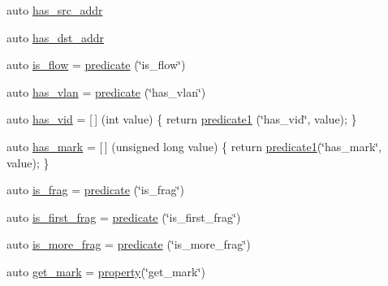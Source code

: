 \begin{DoxyCompactItemize}
\item 
auto \hyperlink{namespacepfq__lang_1_1anonymous__namespace_02default_8hpp_03_aabc75799de679df702f4179ead82114c}{has\+\_\+src\+\_\+addr}
\item 
auto \hyperlink{namespacepfq__lang_1_1anonymous__namespace_02default_8hpp_03_af223a0513ceffa69c0b8535a7cca12da}{has\+\_\+dst\+\_\+addr}
\item 
auto \hyperlink{namespacepfq__lang_1_1anonymous__namespace_02default_8hpp_03_a32aab6804e2daac2458f7c050ed69cf1}{is\+\_\+flow} = \hyperlink{namespacepfq__lang_abd58b2244ff8b0775a3b5865bc128872}{predicate} (\char`\"{}is\+\_\+flow\char`\"{})
\item 
auto \hyperlink{namespacepfq__lang_1_1anonymous__namespace_02default_8hpp_03_a30a0c8d9bcd28cd17c6c1699c3339c3f}{has\+\_\+vlan} = \hyperlink{namespacepfq__lang_abd58b2244ff8b0775a3b5865bc128872}{predicate} (\char`\"{}has\+\_\+vlan\char`\"{})
\item 
auto \hyperlink{namespacepfq__lang_1_1anonymous__namespace_02default_8hpp_03_adddd2dea56164719f2853af158911a80}{has\+\_\+vid} = \mbox{[}$\,$\mbox{]} (int value) \{ return \hyperlink{namespacepfq__lang_ae23a03cee94b5ddfde4a8d2e5c521f0e}{predicate1} (\char`\"{}has\+\_\+vid\char`\"{}, value); \}
\item 
auto \hyperlink{namespacepfq__lang_1_1anonymous__namespace_02default_8hpp_03_a0f9dc3f39bf9793e766b6312718483f1}{has\+\_\+mark} = \mbox{[}$\,$\mbox{]} (unsigned long value) \{ return \hyperlink{namespacepfq__lang_ae23a03cee94b5ddfde4a8d2e5c521f0e}{predicate1}(\char`\"{}has\+\_\+mark\char`\"{}, value); \}
\item 
auto \hyperlink{namespacepfq__lang_1_1anonymous__namespace_02default_8hpp_03_a8fa70cc0ae09592136e8e04e60a98ab6}{is\+\_\+frag} = \hyperlink{namespacepfq__lang_abd58b2244ff8b0775a3b5865bc128872}{predicate} (\char`\"{}is\+\_\+frag\char`\"{})
\item 
auto \hyperlink{namespacepfq__lang_1_1anonymous__namespace_02default_8hpp_03_a235bc51b1c287765f0a4bd391ed089a9}{is\+\_\+first\+\_\+frag} = \hyperlink{namespacepfq__lang_abd58b2244ff8b0775a3b5865bc128872}{predicate} (\char`\"{}is\+\_\+first\+\_\+frag\char`\"{})
\item 
auto \hyperlink{namespacepfq__lang_1_1anonymous__namespace_02default_8hpp_03_a2e8c6d9921b25eecb2a880f73f1beb3c}{is\+\_\+more\+\_\+frag} = \hyperlink{namespacepfq__lang_abd58b2244ff8b0775a3b5865bc128872}{predicate} (\char`\"{}is\+\_\+more\+\_\+frag\char`\"{})
\item 
auto \hyperlink{namespacepfq__lang_1_1anonymous__namespace_02default_8hpp_03_a85f5de783fc38d6c0539f1f4afac189b}{get\+\_\+mark} = \hyperlink{namespacepfq__lang_ad70b40071ed0fd32c05ab8e82bbfec61}{property}(\char`\"{}get\+\_\+mark\char`\"{})

\end{DoxyCompactItemize}
